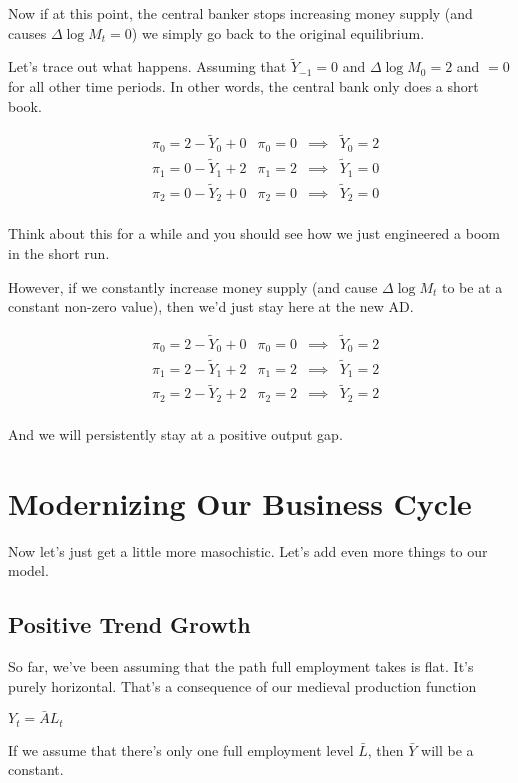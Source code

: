 \documentclass[11pt]{scrartcl}
\newcommand{\og}{\ensuremath{\tilde{Y}}}
\begin{document}
Now if at this point, the central banker stops increasing money supply (and causes $\Delta \log{M_t} = 0$) we simply go back to the original equilibrium.

Let's trace out what happens. Assuming that $\og_{-1} = 0$ and $\Delta \log{M_0} = 2$ and $=0$ for all other time periods. In other words, the central bank only does a short book.

\begin{align*}
&\pi_0 = 2 - \og_0 + 0 &\pi_0 = 0 &\implies &\og_0 = 2 \\
&\pi_1 = 0 - \og_1 + 2 &\pi_1 = 2 &\implies &\og_1 = 0 \\
&\pi_2 = 0 - \og_2 + 0 &\pi_2 = 0 &\implies &\og_2 = 0 \\
\end{align*}

Think about this for a while and you should see how we just engineered a boom in the short run.

However, if we constantly increase money supply (and cause $\Delta \log{M_t}$ to be at a constant non-zero value), then we'd just stay here at the new AD.

\begin{align*}
&\pi_0 = 2 - \og_0 + 0 &\pi_0 = 0 &\implies &\og_0 = 2 \\
&\pi_1 = 2 - \og_1 + 2 &\pi_1 = 2 &\implies &\og_1 = 2 \\
&\pi_2 = 2 - \og_2 + 2 &\pi_2 = 2 &\implies &\og_2 = 2 \\
\end{align*}

And we will persistently stay at a positive output gap.

\section{Modernizing Our Business Cycle}

Now let's just get a little more masochistic. Let's add even more things to our model.

\subsection{Positive Trend Growth}

So far, we've been assuming that the path full employment takes is flat. It's purely horizontal. That's a consequence of our medieval production function

$Y_t = \bar{A} L_t$

If we assume that there's only one full employment level $\bar{L}$, then $\bar{Y}$ will be a constant.
\end{document}
